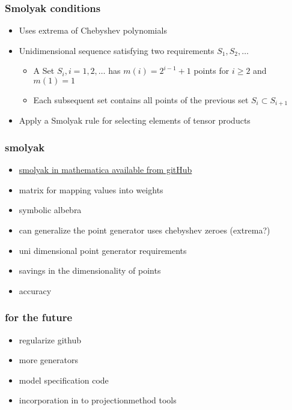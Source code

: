 \documentclass[tikz]{beamer}
\begin{document}
\begin{frame}
  \frametitle{Smolyak conditions}
  \begin{itemize}
  \item Uses extrema of Chebyshev polynomials
  \item Unidimensional sequence satisfying two requirements
$S_1, S_2, \ldots$
    \begin{itemize}
    \item A Set $S_i , i=1,2,\ldots$ has $m(i) = 2^{i-1}+1$ points for $i\ge 2 $ and $m(1)=1$
    \item Each subsequent set contains all points of the previous set  $S_i \subset S_{i+1}$
    \end{itemize}
  \item Apply a Smolyak rule for selecting elements of tensor products
  \end{itemize}
\end{frame}

\begin{frame}
  \frametitle{smolyak}

  \begin{itemize}
  \item \href{https://github.com/es335mathwiz/mathSmolyak.git}{smolyak in mathematica available from gitHub}
  \item matrix for mapping values into weights
  \item symbolic albebra
  \item can generalize the point generator uses chebyshev zeroes (extrema?)
  \item uni dimensional point generator requirements
  \item savings in the dimensionality of points
  \item accuracy
  \end{itemize}
\end{frame}


\begin{frame}
  \frametitle{for the future}
  \begin{itemize}
  \item regularize github
  \item more generators
  \item model specification code
  \item incorporation in to projectionmethod tools
  \end{itemize}
\end{frame}


\end{document}
